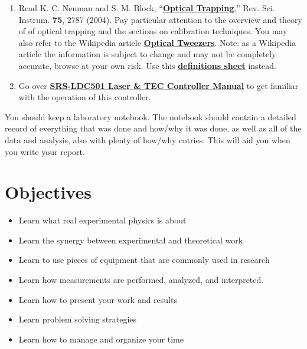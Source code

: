 \documentclass{../lab}
\begin{document}
\begin{enumerate}
    \item Read K. C. Neuman and S. M. Block, ``\href{http://physics111.lib.berkeley.edu/Physics111/Reprints/OTZ/Neuman-optical_Trapping.pdf}{\textbf{Optical Trapping}},'' Rev. Sci. Instrum. \textbf{75}, 2787 (2004). Pay particular attention to the overview and theory of of optical trapping and the sections on calibration techniques. You may also refer to the Wikipedia article \href{http://en.wikipedia.org/wiki/Optical\_tweezers}{\textbf{Optical Tweezers}}. Note: as a Wikipedia article the information is subject to change and may not be completely accurate, browse at your own risk. Use this \href{http://physics111.lib.berkeley.edu/Physics111/Reprints/OTZ/biowikipedia.pdf}{\textbf{definitions sheet}} instead.

    \item Go over \href{http://experimentationlab.berkeley.edu/sites/default/files/images/LDC501m.pdf}{\textbf{SRS-LDC501 Laser \& TEC Controller Manual}} to get familiar with the operation of this controller.

\end{enumerate}

You should keep a laboratory notebook. The notebook should contain a detailed record of everything that was done and how/why it was done, as well as all of the data and analysis, also with plenty of how/why entries. This will aid you when you write your report.

\section{Objectives}

\begin{itemize}
    \item Learn what real experimental physics is about

    \item Learn the synergy between experimental and theoretical work

    \item Learn to use pieces of equipment that are commonly used in research

    \item Learn how measurements are performed, analyzed, and interpreted.

    \item Learn how to present your work and results

    \item Learn problem solving strategies

    \item Learn how to manage and organize your time
\end{itemize}
\end{document}
